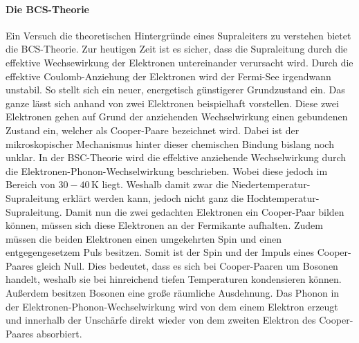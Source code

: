 \paragraph{Die BCS-Theorie}
Ein Versuch die theoretischen Hintergr\"unde eines Supraleiters zu verstehen bietet die BCS-Theorie.
Zur heutigen Zeit ist es sicher, dass die Supraleitung durch die effektive Wechsewirkung der Elektronen untereinander verursacht wird.
Durch die effektive Coulomb-Anziehung der Elektronen wird der Fermi-See irgendwann unstabil.
So stellt sich ein neuer, energetisch g\"unstigerer Grundzustand ein.
Das ganze l\"asst sich anhand von zwei Elektronen beispielhaft vorstellen.
Diese zwei Elektronen gehen auf Grund der anziehenden Wechselwirkung einen gebundenen Zustand ein, welcher als Cooper-Paare bezeichnet wird.
Dabei ist der mikroskopischer Mechanismus hinter dieser chemischen Bindung bislang noch unklar.
In der BSC-Theorie wird die effektive anziehende Wechselwirkung durch die Elektronen-Phonon-Wechselwirkung beschrieben.
Wobei diese jedoch im Bereich von $30-40 \, $K liegt.
Weshalb damit zwar die Niedertemperatur-Supraleitung erkl\"art werden kann, jedoch nicht ganz die Hochtemperatur-Supraleitung.
Damit nun die zwei gedachten Elektronen ein Cooper-Paar bilden k\"onnen, m\"ussen sich diese Elektronen an der Fermikante aufhalten.
Zudem m\"ussen die beiden Elektronen einen umgekehrten Spin und einen entgegengesetzem Puls besitzen.
Somit ist der Spin und der Impuls eines Cooper-Paares gleich Null.
Dies bedeutet, dass es sich bei Cooper-Paaren um Bosonen handelt, weshalb sie bei hinreichend tiefen Temperaturen kondensieren k\"onnen.
Au{\ss}erdem besitzen Bosonen eine gro{\ss}e r\"aumliche Ausdehnung.
Das Phonon in der Elektronen-Phonon-Wechselwirkung wird von dem einem Elektron erzeugt und innerhalb der Unsch\"arfe direkt wieder von dem zweiten Elektron des Cooper-Paares absorbiert.
